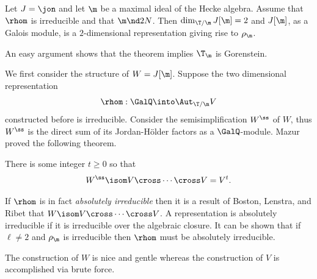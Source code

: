 \documentclass{report}
\begin{document}
\begin{theorem}
Let $J=\jon$ and let $\m$ be a maximal ideal of the Hecke algebra.
Assume that $\rhom$ is irreducible and that $\m\nd 2N$.
Then $\dim_{\T/\m}J[\m]=2$ and $J[\m]$, as a Galois module, is a
$2$-dimensional representation giving rise to $\rho_{\m}$.
\end{theorem}
An easy argument shows that the theorem implies $\T_\m$ is Gorenstein.

We first consider the structure of $W=J[\m]$. Suppose the two dimensional
representation
 $$\rhom:\GalQ\into\Aut_{\T/\m}V$$
constructed before is irreducible.
Consider the semisimplification $W^{\ss}$ of $W$, thus $W^{\ss}$ is
the direct sum of its Jordan-H\"{o}lder factors as a $\GalQ$-module.
Mazur proved the following theorem.
\begin{theorem}
There is some integer $t\geq 0$ so that
$$W^{\ss}\isom V\cross \cdots \cross V=V^t.$$
\end{theorem}

If $\rhom$ is in fact {\em absolutely irreducible} then
it is a result of Boston, Lenstra, and Ribet \cite{boston-lenstra-ribet}
that $W\isom V\cross\cdots\cross V$. A representation is absolutely
irreducible if it is irreducible over the algebraic closure.
It can be shown that if $\ell\neq 2$ and
$\rho_{\m}$ is irreducible then $\rhom$ must be
absolutely irreducible.

The construction of $W$ is nice and gentle whereas the construction
of $V$ is accomplished via brute force.
\end{document}
